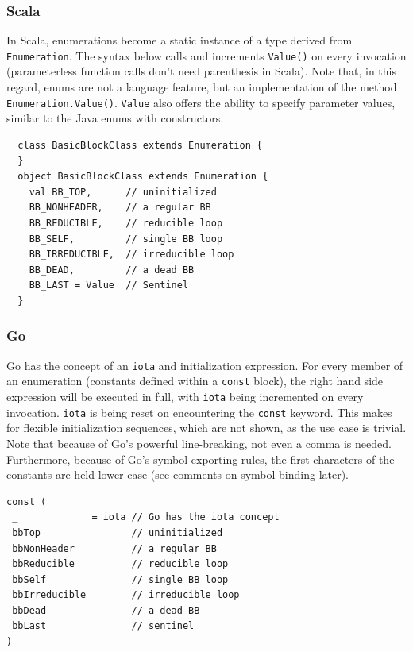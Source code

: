 \subsubsection{Scala}

In Scala, enumerations become a static instance of a type derived from
{\tt Enumeration}. The syntax below calls and increments {\tt Value()}
on every invocation (parameterless function calls don't need
parenthesis in Scala). Note that, in this regard, enums are not a
language feature, but an implementation of the method {\tt
  Enumeration.Value()}.  {\tt Value} also offers the ability to
specify parameter values, similar to the Java enums with constructors.

\begin{footnotesize}
\begin{verbatim}
  class BasicBlockClass extends Enumeration {
  }
  object BasicBlockClass extends Enumeration {
    val BB_TOP,      // uninitialized
    BB_NONHEADER,    // a regular BB
    BB_REDUCIBLE,    // reducible loop
    BB_SELF,         // single BB loop
    BB_IRREDUCIBLE,  // irreducible loop
    BB_DEAD,         // a dead BB
    BB_LAST = Value  // Sentinel
  }
\end{verbatim}
\end{footnotesize}

\subsubsection{Go}

Go has the concept of an {\tt iota} and initialization expression. For
every member of an enumeration (constants defined within a {\tt const}
block), the right hand side expression will be executed in full, with
{\tt iota} being incremented on every invocation. {\tt iota} is being reset on
encountering the {\tt const} keyword. This makes for flexible initialization
sequences, which are not shown, as the use case is trivial. Note that
because of Go's powerful line-breaking, not even a comma is needed. Furthermore,
because of Go's symbol exporting rules, the first characters of the
constants are held lower case (see comments on symbol binding later).

\begin{footnotesize}
\begin{verbatim}
const (
 _             = iota // Go has the iota concept
 bbTop                // uninitialized
 bbNonHeader          // a regular BB
 bbReducible          // reducible loop
 bbSelf               // single BB loop
 bbIrreducible        // irreducible loop
 bbDead               // a dead BB
 bbLast               // sentinel
)
\end{verbatim}
\end{footnotesize}



